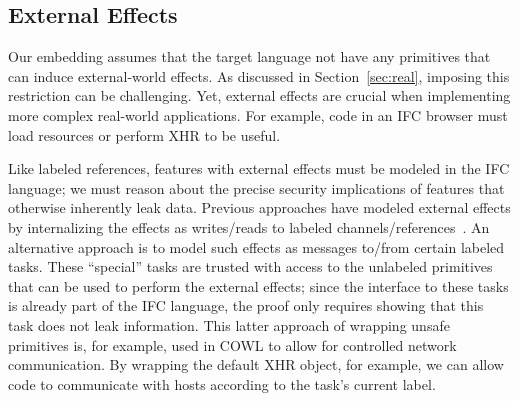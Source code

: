 \subsection{External Effects}
\label{sec:extensions:external}
Our embedding assumes that the target language not have any
primitives that can induce external-world effects.
%
As discussed in Section~\ref{sec:real}, imposing this restriction
can be challenging.
%
Yet, external effects are crucial when implementing more complex
real-world applications.
%
For example, code in an IFC browser must load resources or
perform XHR to be useful.

Like labeled references, features with external effects must be
modeled in the IFC language; we must reason about the precise security
implications of features that otherwise inherently leak data.
%
Previous approaches have modeled external effects by internalizing the
effects as writes/reads to labeled channels/references~\cite{stefan:addressing-covert}.
%
An alternative approach is to model such effects as messages to/from
certain labeled tasks.
%
These ``special'' tasks are trusted with access to the unlabeled
primitives that can be used to perform the external effects; since the
interface to these tasks is already part of the IFC language, the
proof only requires showing that this task does not leak information.
%
This latter approach of wrapping unsafe primitives is, for example,
used in COWL to allow for controlled network communication.
%
By wrapping the default XHR object, for example, we can allow code
to communicate with hosts according to the task's current label.
